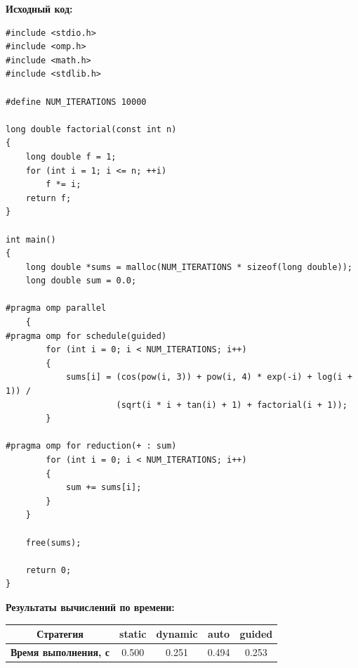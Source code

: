 \documentclass[a4paper,14pt]{extarticle}
\begin{document}
\textbf{Исходный код:}
\begin{verbatim}
#include <stdio.h>
#include <omp.h>
#include <math.h>
#include <stdlib.h>

#define NUM_ITERATIONS 10000

long double factorial(const int n)
{
    long double f = 1;
    for (int i = 1; i <= n; ++i)
        f *= i;
    return f;
}

int main()
{
    long double *sums = malloc(NUM_ITERATIONS * sizeof(long double));
    long double sum = 0.0;

#pragma omp parallel
    {
#pragma omp for schedule(guided)
        for (int i = 0; i < NUM_ITERATIONS; i++)
        {
            sums[i] = (cos(pow(i, 3)) + pow(i, 4) * exp(-i) + log(i + 1)) /
                      (sqrt(i * i + tan(i) + 1) + factorial(i + 1));
        }

#pragma omp for reduction(+ : sum)
        for (int i = 0; i < NUM_ITERATIONS; i++)
        {
            sum += sums[i];
        }
    }

    free(sums);

    return 0;
}
\end{verbatim}

\textbf{Результаты вычислений по времени:}\\
\begin{tabular}{|c|c|c|c|c|}
    \hline
    \textbf{Стратегия} & static & dynamic & auto & guided \\ 
    \hline
    \textbf{Время выполнения, с} & 0.500 & 0.251 & 0.494 & 0.253 \\
    \hline
\end{tabular}\\
\end{document}
